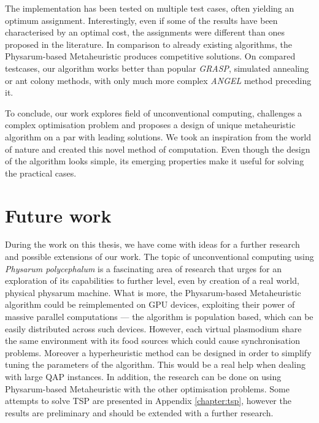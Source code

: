 The implementation has been tested on multiple test cases, often yielding an optimum assignment. Interestingly, even if some of the results have been characterised by an optimal cost, the assignments were different than ones proposed in the literature. In comparison to already existing algorithms, the Physarum-based Metaheuristic produces competitive solutions. On compared testcases, our algorithm works better than popular \textit{GRASP}, simulated annealing or ant colony methods, with only much more complex \textit{ANGEL} method preceding it.

To conclude, our work explores field of unconventional computing, challenges a complex optimisation problem and proposes a design of unique metaheuristic algorithm on a par with leading solutions. We took an inspiration from the world of nature and created this novel method of computation. Even though the design of the algorithm looks simple, its emerging properties make it useful for solving the practical cases. 


\section*{Future work}

During the work on this thesis, we have come with ideas for a further research and possible extensions of our work. The topic of unconventional computing using \textit{Physarum polycephalum} is a fascinating area of research that urges for an exploration of its capabilities to further level, even by creation of a real world, physical physarum machine. What is more, the Physarum-based Metaheuristic algorithm could be reimplemented on GPU devices, exploiting their power of massive parallel computations --- the algorithm is population based, which can be easily distributed across such devices. However, each virtual plasmodium share the same environment with its food sources which could cause synchronisation problems. Moreover a hyperheuristic method can be designed in order to simplify tuning the parameters of the algorithm. This would be a real help when dealing with large QAP instances. In addition, the research can be done on using Physarum-based Metaheuristic with the other optimisation problems. Some attempts to solve TSP are presented in Appendix \ref{chapter:tsp}, however the results are preliminary and should be extended with a further research.
